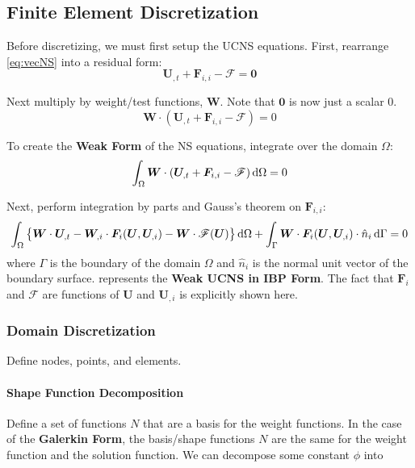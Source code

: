 \documentclass[11pt, letterpaper, twoside]{article}
\renewcommand{\vec}[1]{\bm{#1}}
\newcommand{\U}{\vec{U}}
\newcommand{\F}{\vec{F}}
\newcommand{\W}{\vec{W}}
\newcommand{\src}{\vec{\mathscr{F}}}
\begin{document}
\subsection{Finite Element Discretization}

    Before discretizing, we must first setup the UCNS equations. First, rearrange \cref{eq:vecNS} into a residual form:
    \begin{equation}
        \U_{,t} + \F_{i,i} - \src = \vec{0}
    \end{equation}

    Next multiply by weight/test functions, \(\W\). Note that \(\vec{0}\) is now just a scalar 0.
    \begin{equation}
        \W \cdot ( \U_{,t} + \F_{i,i} - \src )= 0
    \end{equation}

    To create the \textbf{Weak Form} of the NS equations, integrate over the domain \(\Omega\):
    \begin{equation}
        \int_\Omega \W \cdot (\U_{,t} + \F_{i,i} - \src) \dif \Omega= 0
    \end{equation}

    Next, perform integration by parts and Gauss's theorem on \(\F_{i,i}\):
    \begin{equation} \label{eq:weakUCNS_IBP}
        \int_\Omega \left\{\W \cdot \U_{,t} - \W_{,i} \cdot \F_i(\U, \U_{,i}) - \W \cdot \src(\U) \right\} \dif \Omega 
        + \int_\Gamma \W \cdot \F_i(\U, \U_{,i}) \cdot \hat n_i \dif\Gamma= 0
    \end{equation}
    where \(\Gamma\) is the boundary of the domain \(\Omega\) and \(\hat n_i\) is the normal unit vector of the boundary surface.  represents the \textbf{Weak UCNS in IBP Form}. The fact that \(\F_i\) and \(\src\) are functions of \(\U\) and \(\U_{,i}\) is explicitly shown here.

    \subsubsection{Domain Discretization}
        Define nodes, points, and elements. 

        \paragraph{Shape Function Decomposition}
        Define a set of functions \(N\) that are a basis for the weight functions. In the case of the \textbf{Galerkin Form}, the basis/shape functions \(N\) are the same for the weight function and the solution function. We can decompose some constant \(\phi\) into
\end{document}
